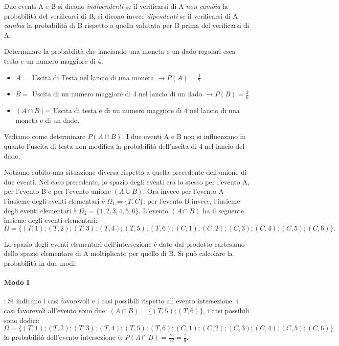 Due eventi A e B si dicono \emph{indipendenti} se il verificarsi di A 
\emph{non 
cambia} la probabilità del verificarsi di B, si dicono invece 
\emph{dipendenti} 
se il verificarsi di A \emph{cambia} la probabilità di B rispetto a quella 
valutata per B prima del verificarsi di A.
\begin{esempio}
Determinare la probabilità che lanciando una moneta e un dado regolari esca 
testa e un numero maggiore di 4.
\begin{itemize}
\item $ A = $ Uscita di Testa nel lancio di una moneta $\to P(A)=\frac 1 2$
\item $ B = $ Uscita di un numero maggiore di 4 nel lancio di un dado $\to 
P(B)=\frac 2 6$
\item $(A\cap B)$= Uscita di testa e di un numero maggiore di 4 nel lancio di 
una moneta e di un dado.
\end{itemize}
Vediamo come determinare $P(A\cap B)$.
I due eventi A e B non si influenzano in quanto l'uscita di testa non 
modifica 
la probabilità dell'uscita di 4 nel lancio del dado.

Notiamo subito una situazione diversa rispetto a quella precedente 
dell'unione 
di due eventi. Nel caso precedente, lo spazio degli eventi era lo stesso per 
l'evento A, per l'evento B e per l'evento unione $(A\cup B)$.
Ora invece per l'evento A l'insieme degli eventi elementari è $\Omega 
_1=\{T,C\}$, per l'evento B invece, l'insieme degli eventi elementari è 
$\Omega 
_2=\{1,2,3,4,5,6\}$. L'evento $(A\cap B)$ ha il seguente insieme degli eventi 
elementari: \[ \Omega 
=\{(T,1);(T,2);(T,3);(T,4);(T,5);(T,6);(C,1);(C,2);(C,3);(C,4);(C,5);(C,6)\}. 
\]

Lo spazio degli eventi elementari dell'intersezione è dato dal prodotto 
cartesiano dello spazio elementare di A moltiplicato per quello di B. Si può 
calcolare la probabilità in due modi:
\paragraph{Modo I}: Si indicano i casi favorevoli e i casi possibili rispetto 
all'evento intersezione: i casi favorevoli all'evento sono due: $(A\cap 
B)=\{(T,5);(T,6)\}$, i casi possibili sono dodici: \[\Omega 
=\{(T,1);(T,2);(T,3);(T,4);(T,5);(T,6);(C,1);(C,2);(C,3);(C,4);(C,5);(C,6)\} 
\] 
la probabilità dell'evento intersezione è: $P(A\cap B)=\frac 2{12}=\frac 1 6$.

\begin{center}
\begin{tikzpicture}[x=10mm,y=10mm,font=\small]


\end{tikzpicture}
\end{center}
\end{esempio}
